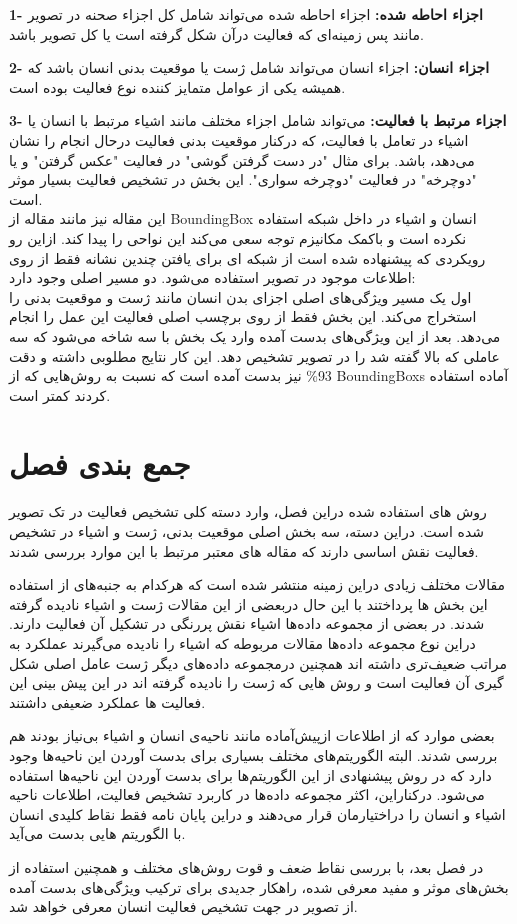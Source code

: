 \textbf{1- اجزاء احاطه شده:}
اجزاء احاطه شده می‌تواند شامل کل اجزاء صحنه در تصویر مانند پس زمینه‌ای که فعالیت درآن شکل گرفته است یا کل تصویر باشد.
 
 \textbf{2- اجزاء انسان:}
 اجزاء انسان می‌تواند شامل ژست یا موقعیت بدنی انسان باشد که همیشه یکی از عوامل متمایز کننده نوع فعالیت بوده است.
 
 \textbf{3- اجزاء مرتبط با فعالیت:}
می‌تواند شامل اجزاء مختلف مانند اشیاء مرتبط با انسان یا اشیاء در تعامل با فعالیت،‌ که درکنار موقعیت بدنی فعالیت درحال انجام را نشان می‌دهد، باشد. برای مثال "در دست گرفتن گوشی" در فعالیت "عکس گرفتن"  و یا "دوچرخه" در فعالیت "دوچرخه سواری". این بخش در تشخیص فعالیت بسیار موثر است.\\
این مقاله نیز مانند مقاله %
\cite{action_multi_att_weakly}
از %
\gls{BoundingBox}
 انسان و اشیاء در داخل شبکه استفاده نکرده است و باکمک مکانیزم توجه سعی می‌کند این نواحی را پیدا کند. ازاین رو رویکردی که پیشنهاده شده است از شبکه ای برای یافتن چندین نشانه فقط از روی اطلاعات موجود در تصویر استفاده ‌می‌شود. دو مسیر اصلی وجود دارد:\\
اول یک مسیر ویژگی‌های اصلی اجزای بدن انسان مانند ژست و موقعیت بدنی را استخراج می‌کند. این بخش فقط از روی برچسب اصلی فعالیت این عمل را انجام ‌می‌دهد. بعد از این ویژگی‌های بدست آمده وارد یک بخش با سه شاخه می‌شود که سه عاملی که بالا گفته شد را در تصویر تشخیص دهد. این کار نتایج مطلوبی داشته و دقت 93\% نیز بدست آمده است که نسبت به روش‌هایی که از %
\glspl{BoundingBox}
 آماده استفاده کردند کمتر است.
\section{جمع بندی فصل}

روش های استفاده شده دراین فصل، وارد دسته کلی تشخیص فعالیت در تک تصویر شده است. دراین دسته، سه بخش اصلی موقعیت بدنی، ژست و اشیاء در تشخیص فعالیت نقش اساسی دارند که مقاله های معتبر مرتبط با این موارد بررسی شدند.

مقالات مختلف زیادی دراین زمینه منتشر شده است که هرکدام به جنبه‌های از استفاده این بخش ها پرداختند با این حال دربعضی از این مقالات ژست و اشیاء نادیده گرفته شدند. در بعضی از مجموعه داده‌ها اشیاء نقش پررنگی در تشکیل آن فعالیت دارند. دراین نوع مجموعه داده‌ها مقالات مربوطه که اشیاء را نادیده می‌گیرند عملکرد به مراتب ضعیف‌تری داشته اند همچنین درمجموعه داده‌های دیگر ژست عامل اصلی شکل گیری آن فعالیت است و روش هایی که ژست را نادیده گرفته اند در این پیش بینی این فعالیت ها عملکرد ضعیفی داشتند.

بعضی موارد که از اطلاعات ازپیش‌آماده مانند ناحیه‌ی انسان و اشیاء بی‌نیاز بودند هم بررسی شدند. البته الگوریتم‌های مختلف بسیاری برای بدست آوردن این ناحیه‌ها وجود دارد که در روش پیشنهادی از این الگوریتم‌ها برای بدست آوردن این ناحیه‌ها استفاده می‌شود. درکناراین،‌ اکثر مجموعه داده‌ها در کاربرد تشخیص فعالیت،‌ اطلاعات ناحیه اشیاء و انسان را دراختیارمان قرار می‌دهند و دراین پایان نامه فقط نقاط کلیدی انسان با الگوریتم هایی بدست می‌آید.

در فصل بعد،‌ با بررسی نقاط ضعف و قوت روش‌های مختلف و همچنین استفاده از بخش‌های موثر و مفید معرفی شده، راهکار جدیدی برای ترکیب ویژگی‌های بدست آمده از تصویر در جهت تشخیص فعالیت انسان معرفی خواهد شد.

